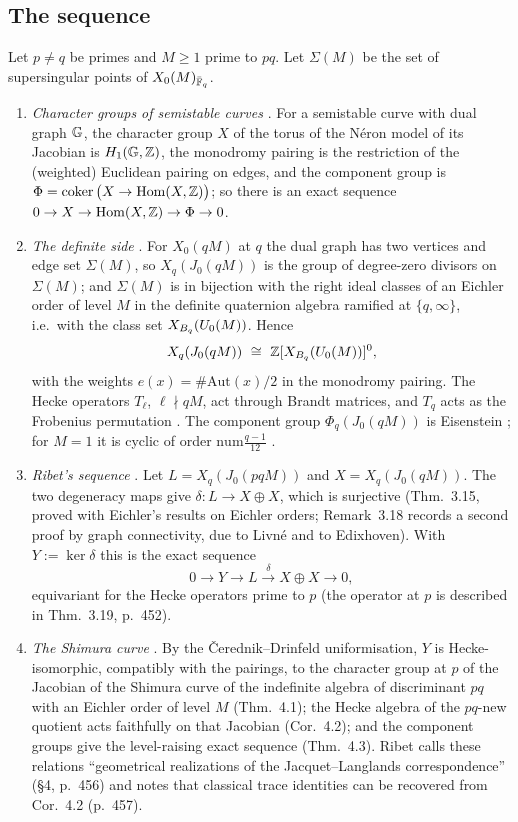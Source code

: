 \subsection{The sequence}\label{ss:s00-ribet-seq}
Let $p\ne q$ be primes and $M\ge1$ prime to $pq$. Let $\Sigma(M)$ be the set of supersingular points of $X_0(M)_{\bar{\mathbb{F}}_q}$.
\begin{enumerate}[label=(R\arabic*)]
\item \emph{Character groups of semistable curves} \cite[Prop.~2.2, Thm.~2.3, p.~436]{Ri90}. For a semistable curve with dual
  graph $\mathbb{G}$, the character group $X$ of the torus of the N\'eron model of its Jacobian is $H_1(\mathbb{G},\mathbb{Z})$, the monodromy pairing is
  the restriction of the (weighted) Euclidean pairing on edges, and the component group is
  $\Phi=\operatorname{coker}\big(X\to\operatorname{Hom}(X,\mathbb{Z})\big)$; so there is an exact sequence $0\to X\to\operatorname{Hom}(X,\mathbb{Z})\to\Phi\to0$.
\item \emph{The definite side} \cite[Prop.~3.1, p.~439; Prop.~3.3 and Variant~3.4, p.~440]{Ri90}. For $X_0(qM)$ at $q$ the dual
  graph has two vertices and edge set $\Sigma(M)$, so $X_q(J_0(qM))$ is the group of degree-zero divisors on $\Sigma(M)$; and
  $\Sigma(M)$ is in bijection with the right ideal classes of an Eichler order of level $M$ in the definite quaternion algebra
  ramified at $\{q,\infty\}$, i.e.\ with the class set $X_{B_q}(U_0(M))$. Hence
  \[X_q(J_0(qM))\ \cong\ \Z[\XBq{\Uzero M}]^0,\]
  with the weights $e(x)=\#\mathrm{Aut}(x)/2$ in the monodromy pairing. The Hecke operators $T_\ell$, $\ell\nmid qM$, act through
  Brandt matrices, and $T_q$ acts as the Frobenius permutation \cite[Prop.~3.8(ii), p.~446]{Ri90}. The component group
  $\Phi_q(J_0(qM))$ is Eisenstein \cite[Thm.~3.12, p.~449]{Ri90}; for $M=1$ it is cyclic of order $\mathrm{num}\frac{q-1}{12}$
  \cite[Appendix, Thm.~A.1(b), p.~173]{Mz}.
\item \emph{Ribet's sequence} \cite[\S3, Thm.~3.15, p.~451, and the sequence before Thm.~3.19, p.~452]{Ri90}. Let $L=X_q(J_0(pqM))$
  and $X=X_q(J_0(qM))$. The two degeneracy maps give $\delta:L\to X\oplus X$, which is surjective (Thm.~3.15, proved with Eichler's
  results on Eichler orders; Remark~3.18 records a second proof by graph connectivity, due to Livn\'e and to Edixhoven). With
  $Y:=\ker\delta$ this is the exact sequence
  \[0\to Y\to L\xrightarrow{\ \delta\ }X\oplus X\to0,\]
  equivariant for the Hecke operators prime to $p$ (the operator at $p$ is described in Thm.~3.19, p.~452).
\item \emph{The Shimura curve} \cite[\S4, Thm.~4.1, Cor.~4.2, Thm.~4.3, p.~457]{Ri90}. By the \v{C}erednik--Drinfeld uniformisation,
  $Y$ is Hecke-isomorphic, compatibly with the pairings, to the character group at $p$ of the Jacobian of the Shimura curve of the
  indefinite algebra of discriminant $pq$ with an Eichler order of level $M$ (Thm.~4.1); the Hecke algebra of the $pq$-new
  quotient acts faithfully on that Jacobian (Cor.~4.2); and the component groups give the level-raising exact sequence
  (Thm.~4.3). Ribet calls these relations ``geometrical realizations of the Jacquet--Langlands correspondence'' (\S4, p.~456) and
  notes that classical trace identities can be recovered from Cor.~4.2 (p.~457).
\end{enumerate}
